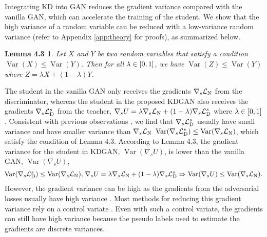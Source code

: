 \documentclass{article}
\newtheorem*{lemma1}{Lemma 4.3}
\newcommand{\LOSS}[2]{\mathcal{#1}_{\rm{#2}}} %
\DeclareMathOperator{\VAR}{Var}
\newcommand{\kdganabbrobj}{U}
\newcommand{\negloss}{\LOSS{L}{N}}
\newcommand{\stddistloss}{\LOSS{L}{D}^{s}}
\newcommand{\stdgrad}{\nabla_{s}}
\newcommand{\stddisgrad}{\stdgrad\negloss}
\newcommand{\stdtchgrad}{\stdgrad\stddistloss}
\begin{document}
Integrating KD into GAN reduces the gradient variance compared with the vanilla GAN, which can accelerate the training of the student.
We show that the high variance of a random variable can be reduced with a low-variance random variance (refer to Appendix \ref{app:theory} for proofs), as summarized below.
\begin{lemma1}
Let $X$ and $Y$ be two random variables that satisfy a condition $\VAR(X)\leq\VAR(Y)$.
Then for all $\lambda\in\interval{0}{1}$, we have $\VAR(Z)\leq\VAR(Y)$ where $Z = \lambda X+ (1-\lambda) Y$.
\end{lemma1}
The student in the vanilla GAN only receives the gradients $\stddisgrad$ from the discriminator, whereas the student in the proposed KDGAN also receives the gradients $\stdtchgrad$ from the teacher, $\stdgrad\kdganabbrobj=\lambda\stddisgrad+(1-\lambda)\stdtchgrad$ where $\lambda\in\interval{0}{1}$.
Consistent with previous observations \cite{hinton2015distilling,sau2016deep}, we find that $\stdtchgrad$ usually have small variance and have smaller variance than $\stddisgrad$ $\VAR(\stdtchgrad)\leq\VAR(\stddisgrad)$, which satisfy the condition of Lemma 4.3.
According to Lemma 4.3, the gradient variance for the student in KDGAN, $\VAR(\stdgrad\kdganabbrobj)$, is lower than the vanilla GAN, $\VAR(\stdgrad\kdganabbrobj)$,
\begin{equation}
\begin{aligned}
\hspace*{-0.04cm}
\VAR(\stdtchgrad)\leq\VAR(\stddisgrad)
\text{,}
\;
\stdgrad\kdganabbrobj=\lambda\stddisgrad+(1-\lambda)\stdtchgrad
\Rightarrow
\VAR(\stdgrad\kdganabbrobj)\leq\VAR(\stddisgrad)
\text{.}
\end{aligned}
\end{equation}%
However, the gradient variance can be high as the gradients from the adversarial losses usually have high variance \cite{chongxuan2017triple,yu2017seqgan}.
Most methods for reducing this gradient variance rely on a control variate \cite{mnih2016variational,wang2017irgan}.
Even with such a control variate, the gradients can still have high variance because the pseudo labels used to estimate the gradients are discrete variances.
\end{document}
